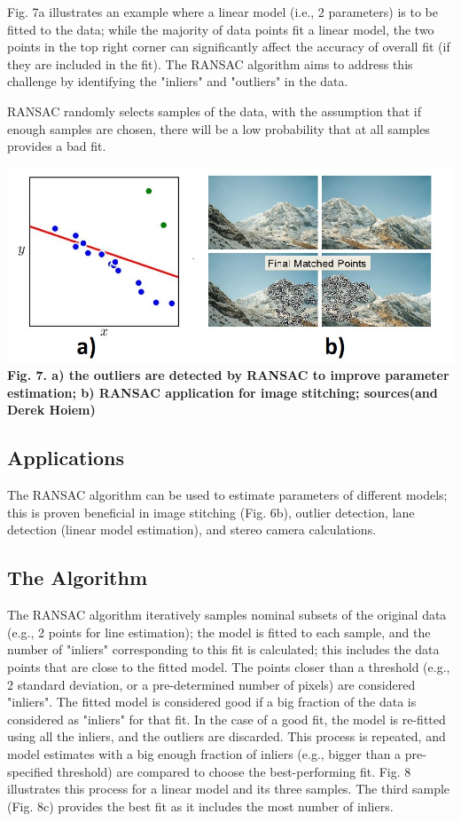 \documentclass{article}
\begin{document}
Fig. 7a illustrates an example where a linear model (i.e., 2 parameters) is to be fitted to the data; while the majority of data points fit a linear model, the two points in the top right corner can significantly affect the accuracy of overall fit (if they are included in the fit). The RANSAC algorithm aims to address this challenge by identifying the "inliers" and "outliers" in the data.

RANSAC randomly selects samples of the data, with the assumption that if enough samples are chosen, there will be a low probability that at all samples provides a bad fit.

\includegraphics[width=\textwidth]{ransac1.png}
\textbf{Fig. 7. a) the outliers are detected by RANSAC to improve parameter estimation; b) RANSAC application for image stitching; sources(\cite{prince2012computer}and Derek Hoiem)}

\subsection{Applications}
The RANSAC algorithm can be used to estimate parameters of different models; this is proven beneficial in image stitching (Fig. 6b), outlier detection, lane detection (linear model estimation), and stereo camera calculations.

\subsection{The Algorithm}
The RANSAC algorithm iteratively samples nominal subsets of the original data (e.g., 2 points for line estimation); the model is fitted to each sample, and the number of "inliers" corresponding to this fit is calculated; this includes the data points that are close to the fitted model. The points closer than a threshold (e.g., 2 standard deviation, or a pre-determined number of pixels) are considered "inliers". The fitted model is considered good if a big fraction of the data is considered as "inliers" for that fit. In the case of a good fit, the model is re-fitted using all the inliers, and the outliers are discarded. This process is repeated, and model estimates with a big enough fraction of inliers (e.g., bigger than a pre-specified threshold) are compared to choose the best-performing fit. Fig. 8 illustrates this process for a linear model and its three samples. The third sample (Fig. 8c) provides the best fit as it includes the most number of inliers.
\end{document}
